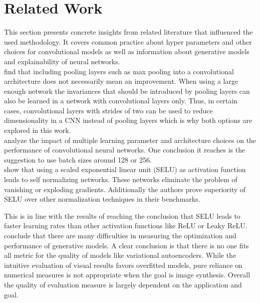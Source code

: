 \section{Related Work} \label{related_work_general_architecture}

This section presents concrete insights from related literature that influenced the used methodology.
It covers common practice about
hyper parameters and other choices for convolutional models as well as information about 
generative models and explainability of neural networks.\\

\textcite{2015-springenberg-striving}
find that including pooling layers such as max pooling into a convolutional architecture does not 
necessarily mean an improvement. When using a large enough network the invariances that should be
introduced by pooling layers can also be learned in a network with convolutional layers only. Thus, in certain cases,
convolutional layers with strides of two can be used to reduce dimensionality in a CNN instead of pooling layers
which is why both options are explored in this work.
\\

\textcite{2016-mishkin-systematic} analyze
the impact of multiple learning parameter and architecture choices on the performance of convolutional neural networks.
One conclusion it reaches is the suggestion to use batch sizes around 128 or 256.\\

\textcite{2017-klambauer-selu} show that using
a scaled exponential linear unit (SELU) as activation function leads to self normalizing networks. These networks 
eliminate the problem of vanishing or exploding gradients. Additionally the authors prove superiority of SELU 
over other normalization techniques in their benchmarks. 

This is in line with the results of \textcite{2018-Pedamonti-comparison} reaching the conclusion that SELU leads
to faster learning rates than other activation functions like ReLU or Leaky ReLU.\\

\textcite{2015-theis-generative}
conclude that there are many difficulties in
measuring the optimization and performance of generative models. A clear conclusion is that there is no 
one fits all metric for the quality of models like variational autoencoders. While the intuitive evaluation
of visual results favors overfitted models, pure reliance on numerical measures is not appropriate when the
goal is image synthesis. Overall the quality of evaluation measure is largely dependent on the application
and goal.\\

